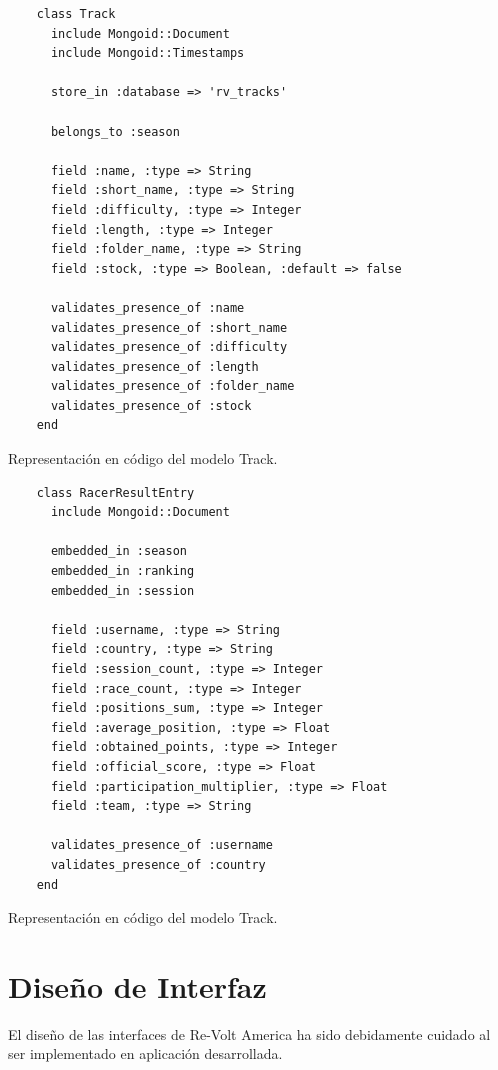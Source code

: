 \begin{listing}
  \begin{verbatim}
    class Track
      include Mongoid::Document
      include Mongoid::Timestamps
      
      store_in :database => 'rv_tracks'
      
      belongs_to :season
      
      field :name, :type => String
      field :short_name, :type => String
      field :difficulty, :type => Integer
      field :length, :type => Integer
      field :folder_name, :type => String
      field :stock, :type => Boolean, :default => false
      
      validates_presence_of :name
      validates_presence_of :short_name
      validates_presence_of :difficulty
      validates_presence_of :length
      validates_presence_of :folder_name
      validates_presence_of :stock
    end
  \end{verbatim}
  \caption[Esquema de Track]{Representación en código del modelo Track.}
\end{listing}

\begin{listing}
  \begin{verbatim}
    class RacerResultEntry
      include Mongoid::Document
      
      embedded_in :season
      embedded_in :ranking
      embedded_in :session
      
      field :username, :type => String
      field :country, :type => String
      field :session_count, :type => Integer
      field :race_count, :type => Integer
      field :positions_sum, :type => Integer
      field :average_position, :type => Float
      field :obtained_points, :type => Integer
      field :official_score, :type => Float
      field :participation_multiplier, :type => Float
      field :team, :type => String
      
      validates_presence_of :username
      validates_presence_of :country
    end
  \end{verbatim}
  \caption[Esquema de Track]{Representación en código del modelo Track.}
\end{listing}

\clearpage

\section{Diseño de Interfaz}
El diseño de las interfaces de Re-Volt America ha sido debidamente cuidado al ser implementado en aplicación desarrollada.

